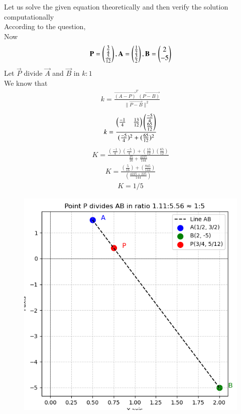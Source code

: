 \documentclass[journal,12pt,onecolumn]{IEEEtran}
\begin{document}
Let us solve the given equation theoretically and then verify the solution computationally \\
According to the question, \\
Now\\
\begin{align}
\mathbf{P}=\begin{pmatrix}\frac{3}{4}\\ \frac{5}{12}\end{pmatrix},\mathbf{A}=\begin{pmatrix}\frac{1}{2} \\ \frac{3}{2}\end{pmatrix},\mathbf{B}=\begin{pmatrix}2\\-5\end{pmatrix}
\end{align}
Let $\vec{P}$ divide $\vec{A}$ and $\vec{B}$ in $k:1$ \\
We know that 
\begin{align}
	k= \frac{\vec{(A-P)}^T\vec{(P-B)}}{\|\vec{P-B}\|^2} 
   \end{align}
   \begin{align}
   k=\frac{\begin{pmatrix}\frac{-1}{4} & \frac{13}{12}\end{pmatrix}\begin{pmatrix}\frac{-5}{4} \\ \frac{65}{12}\end{pmatrix}}{(\frac{-5}{4})^2+(\frac{65}{12})^2} 
   \end{align}
   \begin{align}
       K=\frac{(\frac{-1}{4})(\frac{-5}{4})+(\frac{13}{12})(\frac{65}{12})}{\frac{25}{16}+\frac{4225}{144}}
 \end{align}
 \begin{align}
     K=\frac{(\frac{5}{16})+(\frac{845}{144})}{(\frac{4225+225}{144})}
 \end{align}
\begin{align}
    K=1/5
\end{align}
\begin{figure}[h!]
    \centering
    \includegraphics[width=0.8\linewidth]{figs/fig1.png}
    \caption{}
    \label{fig}
\end{figure}
\end{document}
